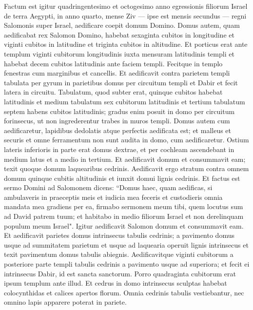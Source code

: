 \begin{biblechapter}  
\verse Factum est igitur quadringentesimo et octogesimo anno egressionis filiorum Israel de terra Aegypti, in anno quarto, mense Ziv — ipse est mensis secundus — regni Salomonis super Israel, aedificare coepit domum Domino. 
\verse Domus autem, quam aedificabat rex Salomon Domino, habebat sexaginta cubitos in longitudine et viginti cubitos in latitudine et triginta cubitos in altitudine. 
\verse Et porticus erat ante templum viginti cubitorum longitudinis iuxta mensuram latitudinis templi et habebat decem cubitos latitudinis ante faciem templi. 
\verse Fecitque in templo fenestras cum marginibus et cancellis. 
\verse Et aedificavit contra parietem templi tabulata per gyrum in parietibus domus per circuitum templi et Dabir et fecit latera in circuitu. 
\verse Tabulatum, quod subter erat, quinque cubitos habebat latitudinis et medium tabulatum sex cubitorum latitudinis et tertium tabulatum septem habens cubitos latitudinis; gradus enim posuit in domo per circuitum forinsecus, ut non ingrederentur trabes in muros templi. 
\verse Domus autem cum aedificaretur, lapidibus dedolatis atque perfectis aedificata est; et malleus et securis et omne ferramentum non sunt audita in domo, cum aedificaretur. 
\verse Ostium lateris inferioris in parte erat domus dextrae, et per cochleam ascendebant in medium latus et a medio in tertium. 
\verse Et aedificavit domum et consummavit eam; texit quoque domum laquearibus cedrinis.  
\verse Aedificavit ergo stratum contra omnem domum quinque cubitis altitudinis et iunxit domui lignis cedrinis. 
\verse Et factus est sermo Domini ad Salomonem dicens: 
\verse “Domus haec, quam aedificas, si ambulaveris in praeceptis meis et iudicia mea feceris et custodieris omnia mandata mea gradiens per ea, firmabo sermonem meum tibi, quem locutus sum ad David patrem tuum; 
\verse et habitabo in medio filiorum Israel et non derelinquam populum meum Israel". 
\verse Igitur aedificavit Salomon domum et consummavit eam. 
\verse Et aedificavit parietes domus intrinsecus tabulis cedrinis; a pavimento domus usque ad summitatem parietum et usque ad laquearia operuit lignis intrinsecus et texit pavimentum domus tabulis abiegnis. 
\verse Aedificavitque viginti cubitorum a posteriore parte templi tabulis cedrinis a pavimento usque ad superiora; et fecit ei intrinsecus Dabir, id est sancta sanctorum. 
\verse Porro quadraginta cubitorum erat ipsum templum ante illud. 
\verse Et cedrus in domo intrinsecus sculptas habebat colocynthidas et calices apertos florum. Omnia cedrinis tabulis vestiebantur, nec omnino lapis apparere poterat in pariete. 

\end{biblechapter}
